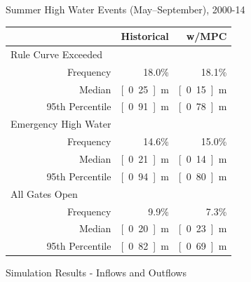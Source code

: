 \documentclass[compress,english]{beamer}
\begin{document}
\begin{frame}{Summer High Water Events (May--September), 2000-14}

\begin{center}	
\begin{tabular}{lrrr}\toprule
\qquad\qquad\qquad\quad & & Historical & w/MPC	\\
\midrule
\multicolumn{2}{l}{Rule Curve Exceeded} & & \\
& Frequency & 18.0\% & 18.1\% \\
& Median & \unit[0.25]{m} & \unit[0.15]{m}\\
& 95th Percentile & \unit[0.91]{m} & \unit[0.78]{m}\\
\midrule
\multicolumn{2}{l}{Emergency High Water} & & \\
& Frequency & 14.6\% & 15.0\%\\
& Median & \unit[0.21]{m} & \unit[0.14]{m} \\
& 95th Percentile & \unit[0.94]{m} & \unit[0.80]{m} \\
\midrule
\multicolumn{2}{l}{All Gates Open} & &\\
& Frequency & 9.9\% & 7.3\% \\
& Median & \unit[0.20]{m} & \unit[0.23]{m}\\
& 95th Percentile & \unit[0.82]{m} & \unit[0.69]{m} \\
\midrule
\end{tabular}
\end{center}

\vspace*{3mm}
\vfill

\end{frame}

\begin{frame}{Simulation Results - Inflows and Outflows}

\vfill
\centering
{}
\vfill

\end{frame}
\end{document}
